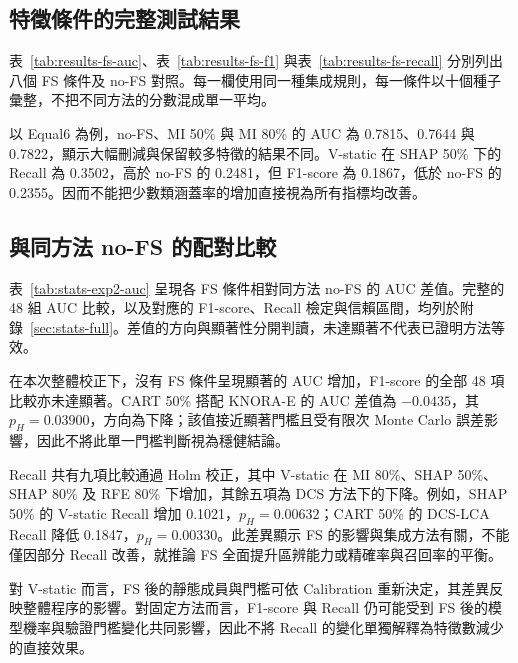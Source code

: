 \subsection{特徵條件的完整測試結果}

表~\ref{tab:results-fs-auc}、表~\ref{tab:results-fs-f1} 與表~\ref{tab:results-fs-recall} 分別列出八個 FS 條件及 no-FS 對照。每一欄使用同一種集成規則，每一條件以十個種子彙整，不把不同方法的分數混成單一平均。





以 Equal6 為例，no-FS、MI 50\% 與 MI 80\% 的 AUC 為 0.7815、0.7644 與 0.7822，顯示大幅刪減與保留較多特徵的結果不同。V-static 在 SHAP 50\% 下的 Recall 為 0.3502，高於 no-FS 的 0.2481，但 F1-score 為 0.1867，低於 no-FS 的 0.2355。因而不能把少數類涵蓋率的增加直接視為所有指標均改善。

\subsection{與同方法 no-FS 的配對比較}



表~\ref{tab:stats-exp2-auc} 呈現各 FS 條件相對同方法 no-FS 的 AUC 差值。完整的 48 組 AUC 比較，以及對應的 F1-score、Recall 檢定與信賴區間，均列於附錄~\ref{sec:stats-full}。差值的方向與顯著性分開判讀，未達顯著不代表已證明方法等效。

在本次整體校正下，沒有 FS 條件呈現顯著的 AUC 增加，F1-score 的全部 48 項比較亦未達顯著。CART 50\% 搭配 KNORA-E 的 AUC 差值為 \(-0.0435\)，其 \(p_H=0.03900\)，方向為下降；該值接近顯著門檻且受有限次 Monte Carlo 誤差影響，因此不將此單一門檻判斷視為穩健結論。

Recall 共有九項比較通過 Holm 校正，其中 V-static 在 MI 80\%、SHAP 50\%、SHAP 80\% 及 RFE 80\% 下增加，其餘五項為 DCS 方法下的下降。例如，SHAP 50\% 的 V-static Recall 增加 0.1021，\(p_H=0.00632\)；CART 50\% 的 DCS-LCA Recall 降低 0.1847，\(p_H=0.00330\)。此差異顯示 FS 的影響與集成方法有關，不能僅因部分 Recall 改善，就推論 FS 全面提升區辨能力或精確率與召回率的平衡。

對 V-static 而言，FS 後的靜態成員與門檻可依 Calibration 重新決定，其差異反映整體程序的影響。對固定方法而言，F1-score 與 Recall 仍可能受到 FS 後的模型機率與驗證門檻變化共同影響，因此不將 Recall 的變化單獨解釋為特徵數減少的直接效果。


